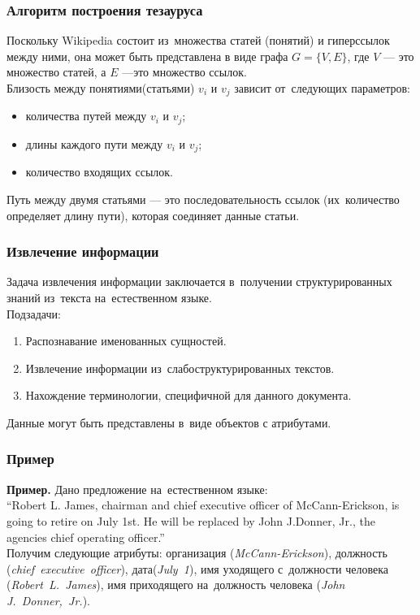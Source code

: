 \documentclass{beamer}
\begin{document}
\begin{frame}
\frametitle{Алгоритм построения тезауруса}
Поскольку Wikipedia состоит из~множества статей (понятий) и гиперссылок между ними, она может быть представлена
в виде графа $G = \{V,E\}$, где $V$  --- это множество статей, а $E$ ---это множество ссылок.\\
Близость между понятиями(статьями) $v_i$ и $v_j$ зависит от~следующих параметров:

\begin{itemize}
\item{количества путей между $v_i$ и $v_j$;}
\item{длины каждого пути между $v_i$ и $v_j$;}
\item{количество входящих ссылок.}
\end{itemize}

Путь между двумя статьями --- это последовательность ссылок (их~количество определяет длину пути), которая соединяет данные статьи.

\end{frame}

\begin{frame}
\frametitle{Извлечение информации}
Задача извлечения информации заключается в~получении структурированных знаний
из~текста на~естественном языке.\\

\vspace{0.5cm}
Подзадачи:
\begin{enumerate}
\item{Распознавание именованных сущностей.}
\item{Извлечение информации из~слабоструктурированных текстов.}
\item{Нахождение терминологии, специфичной для данного документа.}
\end{enumerate}

Данные могут быть представлены в~виде объектов с атрибутами.

\end{frame}

\begin{frame}
\frametitle{Пример}
\textbf{Пример.} Дано предложение на~естественном языке:\\ 
``Robert L. James, chairman and chief executive
officer of McCann-Erickson, is going to retire on July 1st. He will be replaced
by John J.Donner, Jr., the agencies chief operating officer.''\\
\vspace{1cm}
Получим следующие атрибуты: организация (\textsl{McCann-Erickson}), должность (\textsl{chief~executive~officer}), дата(\textsl{July~1}), имя уходящего с~должности человека (\textsl{Robert~L.~James}), имя
приходящего на~должность человека (\textsl{John~ J.~Donner,~Jr.}).
\end{frame}
\end{document}
